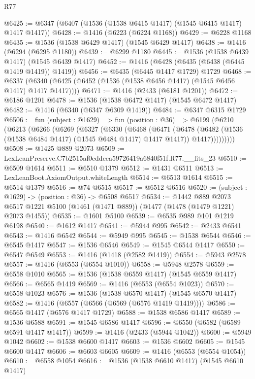 \begin{lexlean}{R77}
\begin{coremodule}
{{@6425 := @6347 (@6407 (@1536 (@1538 @6415 @1417) (@1545 @6415 @1417) @1417 @1417))
@6428 := @1416 (@6223 (@6224 @1168))
@6429 := @6228 @1168
@6435 := @1536 (@1538 @6429 @1417) (@1545 @6429 @1417)
@6438 := @1416 (@6294 (@6295 @1180))
@6439 := @6299 @1180
@6445 := @1536 (@1538 @6439 @1417) (@1545 @6439 @1417)
@6452 := @1416 (@6428 (@6435 (@6438 (@6445 @1419 @1419)) @1419))
@6456 := @6435 (@6445 @1417 @1729) @1729
@6468 := @6337 (@6340 (@6425 (@6452 (@1536 (@1538 @6456 @1417) (@1545 @6456 @1417) @1417 @1417))))
@6471 := @1416 (@2433 (@6181 @1201))
@6472 := @6186 @1201
@6478 := @1536 (@1538 @6472 @1417) (@1545 @6472 @1417)
@6482 := @1416 (@6340 (@6347 @6309 @1419))
@6484 := @6347 @6315 @1729
@6506 := fun (subject : @1629) =>
  fun (position : @36) =>
  @6199
    (@6210
      (@6213
        (@6266
          (@6269
            (@6327
              (@6330
                (@6468
                  (@6471
                    (@6478
                      (@6482 (@1536 (@1538 @6484 @1417) (@1545 @6484 @1417) @1417 @1417))
                      @1417)))))))))
@6508 := @1425 @889 @2073
@6509 := LexLeanPreserve.C7b2515af0eddeea59726419a6840f51f.R77.__fits_23
@6510 := @6509 @1614
@6511 := @6510 @1379
@6512 := @1431 @6511
@6513 := LexLeanBoot.AxiomOutput.whiteLength
@6514 := @6513 @1614
@6515 := @6514 @1379
@6516 := @74 @6515
@6517 := @6512 @6516
@6520 := (subject : @1629) -> (position : @36) -> @6508 @6517
@6534 := @1442
    @889
    @2073
    @6517
    @1221
    @5100
    (@1461 (@1471 @889))
    (@1477 (@1478 (@1479 @1221) @2073 @1455))
@6535 := @1601 @5100
@6539 := @6535 @989 @101 @1219 @6198
@6540 := @1612 @1417
@6541 := @5944 @995
@6542 := @2433 @6541
@6543 := @1416 @6542
@6544 := @5949 @995
@6545 := @1538 @6544
@6546 := @6545 @1417
@6547 := @1536 @6546
@6549 := @1545 @6544 @1417
@6550 := @6547 @6549
@6553 := @1416 (@1418 (@2582 @1419))
@6554 := @5943 @2578
@6557 := @1416 (@6553 (@6554 @1010))
@6558 := @5948 @2578
@6559 := @6558 @1010
@6565 := @1536 (@1538 @6559 @1417) (@1545 @6559 @1417)
@6566 := @6565 @1419
@6569 := @1416 (@6553 (@6554 @1023))
@6570 := @6558 @1023
@6576 := @1536 (@1538 @6570 @1417) (@1545 @6570 @1417)
@6582 := @1416 (@6557 (@6566 (@6569 (@6576 @1419 @1419))))
@6586 := @6565 @1417 (@6576 @1417 @1729)
@6588 := @1538 @6586 @1417
@6589 := @1536 @6588
@6591 := @1545 @6586 @1417
@6596 := @6550 (@6582 (@6589 @6591 @1417 @1417))
@6599 := @1416 (@2433 (@5944 @1042))
@6600 := @5949 @1042
@6602 := @1538 @6600 @1417
@6603 := @1536 @6602
@6605 := @1545 @6600 @1417
@6606 := @6603 @6605
@6609 := @1416 (@6553 (@6554 @1054))
@6610 := @6558 @1054
@6616 := @1536 (@1538 @6610 @1417) (@1545 @6610 @1417)
}}
\end{coremodule}
\end{lexlean}
